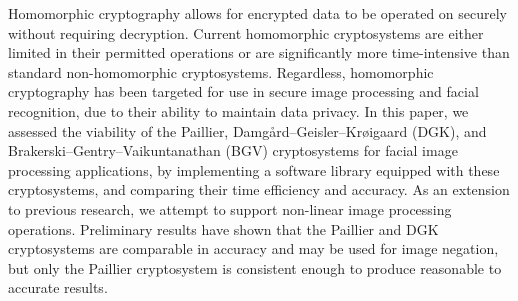 Homomorphic cryptography allows for encrypted data to be operated on securely without requiring decryption. Current homomorphic cryptosystems are either limited in their permitted operations or are significantly more time-intensive than standard non-homomorphic cryptosystems. Regardless, homomorphic cryptography has been targeted for use in secure image processing and facial recognition, due to their ability to maintain data privacy. In this paper, we assessed the viability of the Paillier, Damg{\aa}rd--Geisler--Kr{\o}igaard (DGK), and Brakerski--Gentry--Vaikuntanathan (BGV) cryptosystems for facial image processing applications, by implementing a software library equipped with these cryptosystems, and comparing their time efficiency and accuracy. As an extension to previous research, we attempt to support non-linear image processing operations. Preliminary results have shown that the Paillier and DGK cryptosystems are comparable in accuracy and may be used for image negation, but only the Paillier cryptosystem is consistent enough to produce reasonable to accurate results.